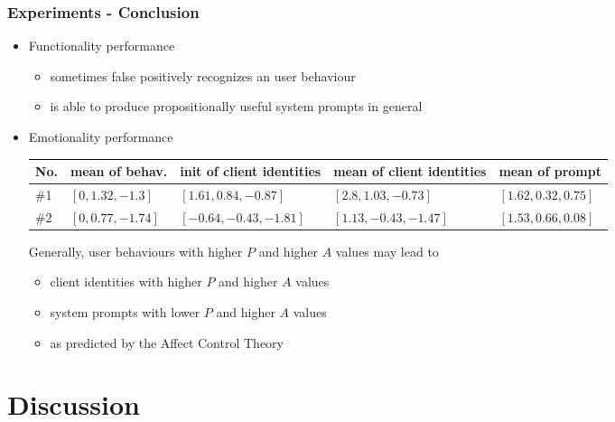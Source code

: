 \documentclass{beamer}
\begin{document}
\begin{frame}
\frametitle{Experiments - Conclusion}
\begin{itemize}
\item Functionality performance
\begin{itemize}
\item sometimes false positively recognizes an user behaviour
\item is able to produce propositionally useful system prompts in general
\end{itemize}
\item Emotionality performance
\begin{table}
\scriptsize
\centering
\begin{tabular}{|  p{0.3cm} | p{1.8cm} |  p{2.5cm} |  p{2.5cm} | p{2cm} |}
\hline
No. & mean of behav. & init of client identities & mean of client identities & mean of prompt \\ \hline
\#1 & $[0,1.32,-1.3]$ & $[1.61,0.84,-0.87]$ &  $[2.8,1.03,-0.73]$ & $[1.62,0.32,0.75]$ \\ \hline
\#2 & $[0,0.77,-1.74]$ & $[-0.64,-0.43,-1.81]$ & $[1.13,-0.43,-1.47]$ & $[1.53,0.66,0.08]$ \\ \hline
\end{tabular}
\end{table}
\vspace{.3cm}
Generally, user behaviours with higher $P$ and higher $A$ values may lead to
\begin{itemize}
\item client identities with higher $P$ and higher $A$ values
\item system prompts with lower $P$ and higher $A$ values
\item as predicted by the Affect Control Theory
\end{itemize}
\end{itemize}
\end{frame}

\section{Discussion}
\end{document}
